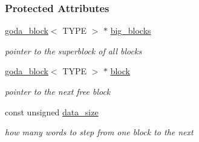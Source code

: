 \subsubsection*{Protected Attributes}
\begin{DoxyCompactItemize}
\item 
\mbox{\label{group__memorygroup_a4c411227a9a3646010a1f22840094c21}} 
\hyperlink{group__memorygroup_uniongoda__block}{goda\+\_\+block}$<$ T\+Y\+PE $>$ $\ast$ \hyperlink{group__memorygroup_a4c411227a9a3646010a1f22840094c21}{big\+\_\+blocks}
\begin{DoxyCompactList}\small\item\em pointer to the superblock of all blocks \end{DoxyCompactList}\item 
\mbox{\label{group__memorygroup_a15e185c6ba2c5262bc03ad13e2dbc223}} 
\hyperlink{group__memorygroup_uniongoda__block}{goda\+\_\+block}$<$ T\+Y\+PE $>$ $\ast$ \hyperlink{group__memorygroup_a15e185c6ba2c5262bc03ad13e2dbc223}{block}
\begin{DoxyCompactList}\small\item\em pointer to the next free block \end{DoxyCompactList}\item 
\mbox{\label{group__memorygroup_a7073b652fe474ccd684c1eebd2129a0b}} 
const unsigned \hyperlink{group__memorygroup_a7073b652fe474ccd684c1eebd2129a0b}{data\+\_\+size}
\begin{DoxyCompactList}\small\item\em how many words to step from one block to the next \end{DoxyCompactList}\end{DoxyCompactItemize}


